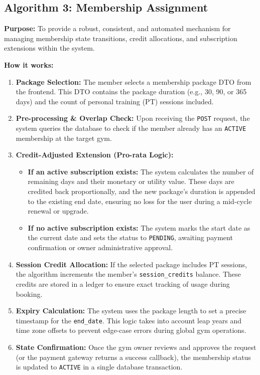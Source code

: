 \documentclass[
  12pt,
  a4paperpaper,
]{report}
\begin{document}
\subsection{Algorithm 3: Membership Assignment}\label{algo-membership}

\noindent\textbf{Purpose:} To provide a robust, consistent, and automated mechanism for managing membership state transitions, credit allocations, and subscription extensions within the system.

\smallskip
\noindent\textbf{How it works:}
\begin{enumerate}
    \item \textbf{Package Selection:} The member selects a membership package DTO from the frontend. This DTO contains the package duration (e.g., 30, 90, or 365 days) and the count of personal training (PT) sessions included.
    \item \textbf{Pre-processing \& Overlap Check:} Upon receiving the \texttt{POST} request, the system queries the database to check if the member already has an \texttt{ACTIVE} membership at the target gym.
    \item \textbf{Credit-Adjusted Extension (Pro-rata Logic):} 
    \begin{itemize}
        \item \textbf{If an active subscription exists:} The system calculates the number of remaining days and their monetary or utility value. These days are credited back proportionally, and the new package's duration is appended to the existing end date, ensuring no loss for the user during a mid-cycle renewal or upgrade.
        \item \textbf{If no active subscription exists:} The system marks the start date as the current date and sets the status to \texttt{PENDING}, awaiting payment confirmation or owner administrative approval.
    \end{itemize}
    \item \textbf{Session Credit Allocation:} If the selected package includes PT sessions, the algorithm increments the member's \texttt{session\_credits} balance. These credits are stored in a ledger to ensure exact tracking of usage during booking.
    \item \textbf{Expiry Calculation:} The system uses the package length to set a precise timestamp for the \texttt{end\_date}. This logic takes into account leap years and time zone offsets to prevent edge-case errors during global gym operations.
    \item \textbf{State Confirmation:} Once the gym owner reviews and approves the request (or the payment gateway returns a success callback), the membership status is updated to \texttt{ACTIVE} in a single database transaction.
\end{enumerate}
\end{document}
